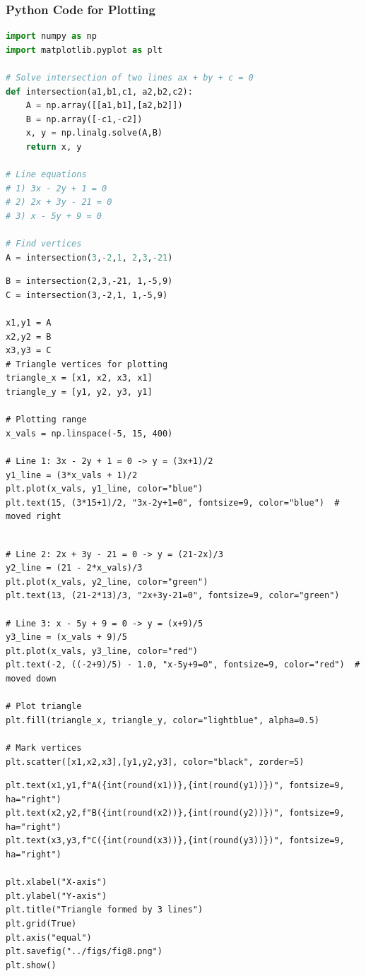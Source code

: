 \documentclass{beamer}
\theoremstyle{remark}
\numberwithin{equation}{section}
\begin{document}
\begin{frame}[fragile]
\frametitle{Python Code for Plotting}
\begin{lstlisting}[language=Python]
import numpy as np
import matplotlib.pyplot as plt

# Solve intersection of two lines ax + by + c = 0
def intersection(a1,b1,c1, a2,b2,c2):
    A = np.array([[a1,b1],[a2,b2]])
    B = np.array([-c1,-c2])
    x, y = np.linalg.solve(A,B)
    return x, y

# Line equations
# 1) 3x - 2y + 1 = 0
# 2) 2x + 3y - 21 = 0
# 3) x - 5y + 9 = 0

# Find vertices
A = intersection(3,-2,1, 2,3,-21)
\end{lstlisting}
\end{frame}
\begin{frame}[fragile]
\begin{lstlisting}
B = intersection(2,3,-21, 1,-5,9)
C = intersection(3,-2,1, 1,-5,9)

x1,y1 = A
x2,y2 = B
x3,y3 = C
# Triangle vertices for plotting
triangle_x = [x1, x2, x3, x1]
triangle_y = [y1, y2, y3, y1]

# Plotting range
x_vals = np.linspace(-5, 15, 400)

# Line 1: 3x - 2y + 1 = 0 -> y = (3x+1)/2
y1_line = (3*x_vals + 1)/2
plt.plot(x_vals, y1_line, color="blue")
plt.text(15, (3*15+1)/2, "3x-2y+1=0", fontsize=9, color="blue")  # moved right
\end{lstlisting}
\end{frame}
\begin{frame}[fragile]
\begin{lstlisting}

# Line 2: 2x + 3y - 21 = 0 -> y = (21-2x)/3
y2_line = (21 - 2*x_vals)/3
plt.plot(x_vals, y2_line, color="green")
plt.text(13, (21-2*13)/3, "2x+3y-21=0", fontsize=9, color="green")

# Line 3: x - 5y + 9 = 0 -> y = (x+9)/5
y3_line = (x_vals + 9)/5
plt.plot(x_vals, y3_line, color="red")
plt.text(-2, ((-2+9)/5) - 1.0, "x-5y+9=0", fontsize=9, color="red")  # moved down

# Plot triangle
plt.fill(triangle_x, triangle_y, color="lightblue", alpha=0.5)

# Mark vertices
plt.scatter([x1,x2,x3],[y1,y2,y3], color="black", zorder=5)
\end{lstlisting}
\end{frame}
\begin{frame}[fragile]
\begin{lstlisting}
plt.text(x1,y1,f"A({int(round(x1))},{int(round(y1))})", fontsize=9, ha="right")
plt.text(x2,y2,f"B({int(round(x2))},{int(round(y2))})", fontsize=9, ha="right")
plt.text(x3,y3,f"C({int(round(x3))},{int(round(y3))})", fontsize=9, ha="right")

plt.xlabel("X-axis")
plt.ylabel("Y-axis")
plt.title("Triangle formed by 3 lines")
plt.grid(True)
plt.axis("equal")
plt.savefig("../figs/fig8.png")
plt.show()

\end{lstlisting}
\end{frame}
\end{document}
